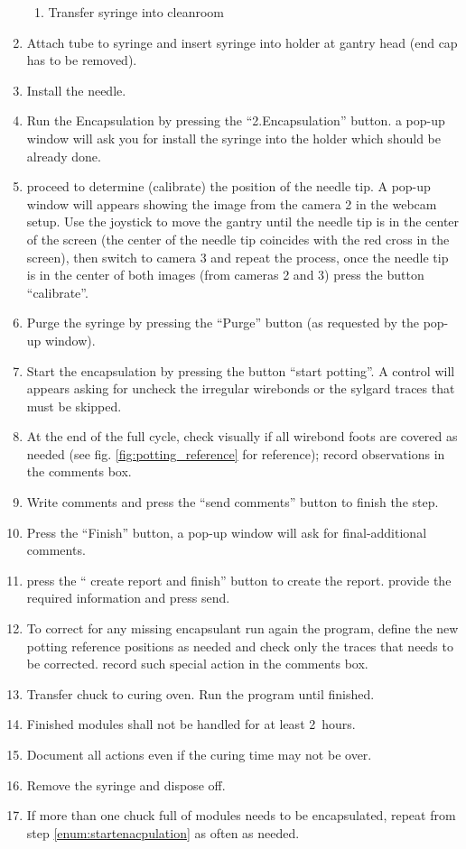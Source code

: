 \documentclass[12pt]{unlsilabsop}
\begin{document}
\begin{enumerate}
\begin{enumerate}
	\item Transfer syringe into cleanroom
    \end{enumerate}
    \item Attach tube to syringe and insert syringe into holder at gantry head (end cap has to be removed).
    \item Install the needle.
    \item Run the Encapsulation by pressing the ``2.Encapsulation'' button. a pop-up window will ask you for install the syringe into the holder which should be already done.
    \item proceed to determine (calibrate) the position of the needle tip. A pop-up window will appears showing the image from the camera 2 in the webcam setup. Use the joystick to move the gantry until the needle tip is in the center of the screen (the center of the needle tip coincides with the red cross in the screen), then switch to camera 3 and repeat the process, once the needle tip is in the center of both images (from cameras 2 and 3) press the button ``calibrate''.
    \item Purge the syringe by pressing the ``Purge'' button (as requested by the pop-up window).
    \item Start the encapsulation by pressing the button ``start potting''. A control will appears asking for uncheck the irregular wirebonds or the sylgard traces that must be skipped.     
    \item At the end of the full cycle, check visually if all wirebond foots are covered as needed (see fig. \ref{fig:potting_reference} for reference); record observations in the comments box.
    \item Write comments and press the ``send comments'' button to finish the step. 
    \item Press the ``Finish'' button, a pop-up window will ask for final-additional comments.
    \item press the `` create report and finish'' button to create the report. provide the required information and press send.
      \item To correct for any missing encapsulant run again the program, define the new potting reference positions as needed and check only the traces that needs to be corrected. record such special action in the comments box.
    \item Transfer chuck to curing oven. Run the program until finished.
    \item Finished modules shall not be handled for at least 2~hours.
    \item Document all actions even if the curing time may not be over.
    \item Remove the syringe and dispose off.   
    \item If more than one chuck full of modules needs to be encapsulated, repeat from step \ref{enum:startenacpulation} as often as needed.
\end{enumerate}
\end{document}
